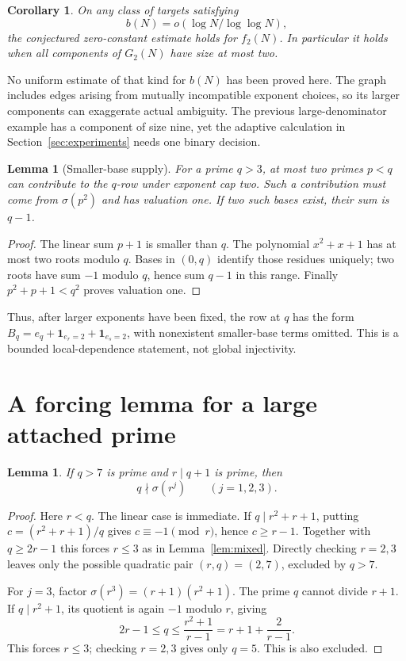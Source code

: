\documentclass[11pt]{article}
\newtheorem{lemma}[theorem]{Lemma}
\newtheorem{corollary}[theorem]{Corollary}
\begin{document}
\begin{corollary}
On any class of targets satisfying
\[
 b(N)=o(\log N/\log\log N),
\]
the conjectured zero-constant estimate holds for $f_2(N)$. In particular it holds when all components of $G_2(N)$ have size at most two.
\end{corollary}

No uniform estimate of that kind for $b(N)$ has been proved here. The graph includes edges arising from mutually incompatible exponent choices, so its larger components can exaggerate actual ambiguity. The previous large-denominator example has a component of size nine, yet the adaptive calculation in Section~\ref{sec:experiments} needs one binary decision.

\begin{lemma}[Smaller-base supply]\label{lem:supply}
For a prime $q>3$, at most two primes $p<q$ can contribute to the $q$-row under exponent cap two. Such a contribution must come from $\sigma(p^2)$ and has valuation one. If two such bases exist, their sum is $q-1$.
\end{lemma}
\begin{proof}
The linear sum $p+1$ is smaller than $q$. The polynomial $x^2+x+1$ has at most two roots modulo $q$. Bases in $(0,q)$ identify those residues uniquely; two roots have sum $-1$ modulo $q$, hence sum $q-1$ in this range. Finally $p^2+p+1<q^2$ proves valuation one.
\end{proof}

Thus, after larger exponents have been fixed, the row at $q$ has the form $B_q=e_q+\mathbf1_{e_r=2}+\mathbf1_{e_s=2}$, with nonexistent smaller-base terms omitted. This is a bounded local-dependence statement, not global injectivity.

\section{A forcing lemma for a large attached prime}
\begin{lemma}\label{lem:attachment}
If $q>7$ is prime and $r\mid q+1$ is prime, then
\[
 q\nmid\sigma(r^j)\qquad(j=1,2,3).
\]
\end{lemma}
\begin{proof}
Here $r<q$. The linear case is immediate. If $q\mid r^2+r+1$, putting $c=(r^2+r+1)/q$ gives $c\equiv-1\pmod r$, hence $c\ge r-1$. Together with $q\ge2r-1$ this forces $r\le3$ as in Lemma~\ref{lem:mixed}. Directly checking $r=2,3$ leaves only the possible quadratic pair $(r,q)=(2,7)$, excluded by $q>7$.

For $j=3$, factor $\sigma(r^3)=(r+1)(r^2+1)$. The prime $q$ cannot divide $r+1$. If $q\mid r^2+1$, its quotient is again $-1$ modulo $r$, giving
\[
 2r-1\le q\le\frac{r^2+1}{r-1}=r+1+\frac2{r-1}.
\]
This forces $r\le3$; checking $r=2,3$ gives only $q=5$. This is also excluded.
\end{proof}
\end{document}
